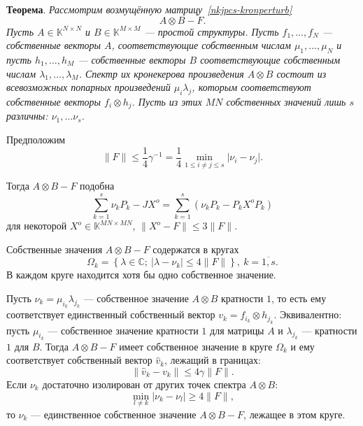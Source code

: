\begingroup
\textbf{Теорема}.
\itshape
    Рассмотрим возмущённую матрицу~\eqref{nkjpcs-kronperturb}
        \[
            A{\otimes}B - F.
        \]
    Пусть \( A\in\mathbb{K}^{N{\times}N} \) и \( B\in\mathbb{K}^{M{\times}M} \)
        --- простой структуры.
    Пусть \( f_1, \ldots, f_N \) --- собственные векторы \( A \),
        соответствующие собственным числам \( \mu_1, \ldots, \mu_N \)
        и пусть \( h_1, \ldots, h_M \) --- собственные векторы \( B \)
        соответствующие собственным числам \( \lambda_1, \ldots, \lambda_M \).
    Спектр их кронекерова произведения \( A{\otimes}B \)
        состоит из всевозможных попарных произведений \( \mu_i \lambda_j \),
        которым соответствуют собственные векторы \( f_i\otimes h_j \).
    Пусть из этих \( MN \) собственных значений лишь \( s \) различны:
        \( \nu_1, \ldots \nu_s \).

    Предположим
    \[
        \|F\| \leq \frac14 \gamma^{-1} = \frac14 \min_{1\leq i{\neq}j\leq s}\lvert\nu_i - \nu_j\rvert.
    \]

    Тогда \( A{\otimes}B - F \) подобна
    \[ \sum_{k=1}^s \nu_k P_k - JX^o = \sum_{k=1}^s (\nu_k P_k - P_k X^o P_k) \]
    для некоторой \( X^o \in \mathbb{K}^{MN{\times}MN} \),
    \( \|X^o - F\|\leq 3\|F\| \).

    Собственные значения \( A{\otimes}B - F \) содержатся в кругах
    \[
        \Omega_k = \left\{
            \lambda\in\mathbb{C};
            \ \lvert\lambda - \nu_k\rvert \leq 4\|F\|
            \right\},
        \ k{=}\overline{1,s}.
    \]
    В каждом круге находится хотя бы одно собственное значение.

    Пусть \( \nu_k=\mu_{i_k}\lambda_{j_k} \) --- собственное значение \( A{\otimes}B \) кратности \( 1 \),
        то есть ему соответствует единственный собственный вектор \( v_k = f_{i_k}{\otimes}h_{j_k} \).
    Эквивалентно: пусть \( \mu_{i_k} \) --- собственное значение кратности \( 1 \) для матрицы \( A \)
    и \( \lambda_{j_k} \) --- кратности \( 1\) для \( B \).
    Тогда \( A{\otimes}B - F \) имеет собственное значение в круге \( \Omega_k \)
        и ему соответствует собственный вектор \( \hat{v}_k \), лежащий в границах:
    \[
        \|\hat{v}_k - v_k\| \leq 4\gamma \|F\|.
    \]
    Если \( \nu_k \) достаточно изолирован от других точек спектра \( A{\otimes}B \):
    \[
        \min_{l\neq k}
        \lvert
        \nu_k - \nu_l
        \rvert
        \geq 4\|F\|,
    \]
    то \( \nu_k \) --- единственное собственное значение \( A{\otimes}B - F \),
    лежащее в этом круге.
\endgroup

